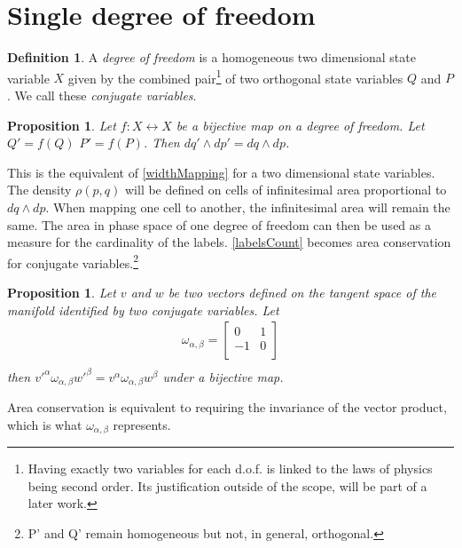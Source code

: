 \documentclass[aps,pra,10pt,twocolumn,floatfix,nofootinbib]{revtex4-1}
\newtheorem{prop}[thm]{Proposition}
\theoremstyle{definition}
\newtheorem{defn}[thm]{Definition}
\begin{document}
\section{Single degree of freedom}

\begin{defn}\label{sdof}
A \emph{degree of freedom} is a homogeneous two dimensional state variable $X$ given by the combined pair\footnote{Having exactly two variables for each d.o.f. is linked to the laws of physics being second order. Its justification outside of the scope, will be part of a later work.} of two orthogonal state variables $Q$ and $P$. We call these \emph{conjugate variables}.
\end{defn}

\begin{prop}\label{sdofMap}
Let $f: X \leftrightarrow X$ be a bijective map on a degree of freedom. Let $Q'=f(Q)$ $P'=f(P)$. Then $dq' \wedge dp' = dq \wedge dp$.
\end{prop}

This is the equivalent of \ref{widthMapping} for a two dimensional state variables. The density $\rho(p,q)$ will be defined on cells of infinitesimal area proportional to $dq \wedge dp$. When mapping one cell to another, the infinitesimal area will remain the same. The area in phase space of one degree of freedom can then be used as a measure for the cardinality of the labels. \ref{labelsCount} becomes area conservation for conjugate variables.\footnote{P' and Q' remain homogeneous but not, in general, orthogonal.}

\begin{prop}\label{sdofInvariant}
Let $v$ and $w$ be two vectors defined on the tangent space of the manifold identified by two conjugate variables. Let
\begin{align*}
\omega_{\alpha, \beta} = \left[
  \begin{array}{cc}
    0 & 1 \\
    -1 & 0 \\
  \end{array}
\right] \\
\end{align*}
then $v'^{\alpha} \omega_{\alpha, \beta} w'^{\beta}=v^{\alpha} \omega_{\alpha, \beta} w^{\beta}$ under a bijective map.
\end{prop}

Area conservation is equivalent to requiring the invariance of the vector product, which is what $\omega_{\alpha, \beta}$ represents.
\end{document}

